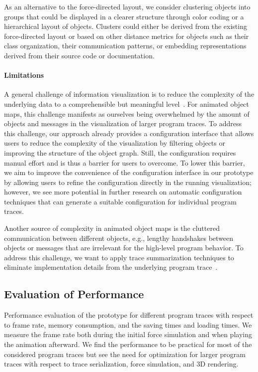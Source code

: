 As an alternative to the force-directed layout, we consider clustering objects into groups that could be displayed in a clearer structure through color coding or a hierarchical layout of objects.
Clusters could either be derived from the existing force-directed layout or based on other distance metrics for objects such as their class organization, their communication patterns, or embedding representations derived from their source code or documentation.

\paragraph{Limitations}

A general challenge of information visualization is to reduce the complexity of the underlying data to a comprehensible but meaningful level~\cite{robertson2009scale}.
For animated object maps, this challenge manifests as ourselves being overwhelmed by the amount of objects and messages in the visualization of larger program traces.
To address this challenge, our approach already provides a configuration interface that allows users to reduce the complexity of the visualization by filtering objects or improving the structure of the object graph.
Still, the configuration requires manual effort and is thus a barrier for users to overcome.
To lower this barrier, we aim to improve the convenience of the configuration interface in our prototype by allowing users to refine the configuration directly in the running visualization; however, we see more potential in further research on automatic configuration techniques that can generate a suitable configuration for individual program traces.

Another source of complexity in animated object maps is the cluttered communication between different objects, e.g., lengthy handshakes between objects or messages that are irrelevant for the high-level program behavior.
To address this challenge, we want to apply trace summarization techniques to eliminate implementation details from the underlying program trace~\cite{hamouLhadj2006summarizing,noda2017identifying}.

\subsection{Evaluation of Performance}

\begin{table*}
	\centering
	\caption{
		Performance evaluation of the \tfd{} prototype for different program traces with respect to frame rate, memory consumption, and the saving times and loading times.
		We measure the frame rate both during the initial force simulation and when playing the animation afterward.
		We find the performance to be practical for most of the considered program traces but see the need for optimization for larger program traces with respect to trace serialization, force simulation, and 3D rendering.
	}
	\label{tab:discussion/performance}
	\begin{threeparttable}
		\centering
		{\footnotesize
		}
	\end{threeparttable}
\end{table*}

